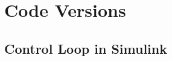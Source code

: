 

\chapter{Code Versions}
\label{chap:CodeVersions}

\section{Control Loop in Simulink}
\label{sec:ControlLoopinSimulink}



